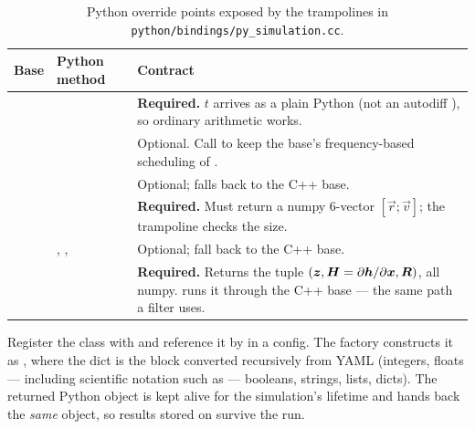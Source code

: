 \begin{table}[H]
  \centering
  \caption{Python override points exposed by the trampolines in
           \texttt{python/bindings/py\_simulation.cc}.}
  \label{tab:sim-trampolines}
  \begin{tabularx}{\textwidth}{@{}l l L@{}}
    \toprule
    Base & Python method & Contract \\
    \midrule
     &  & \textbf{Required.} $t$ arrives as
      a plain Python  (not an autodiff ), so ordinary
      arithmetic works. \\
    &  & Optional. Call
       to keep the base's frequency-based
      scheduling of . \\
    &  & Optional; falls back to the C++ base. \\
     &  & \textbf{Required.} Must return a
      numpy 6-vector $[\vec{r}; \vec{v}]$; the trampoline checks the size. \\
    & , ,  & Optional; fall back to the C++ base. \\
     &  & \textbf{Required.} Returns the
      tuple $(\bm{z}, \bm{H} = \partial \bm{h}/\partial \bm{x}, \bm{R})$, all
      numpy.  runs it through the C++ base --- the same path a
      filter uses. \\
    \bottomrule
  \end{tabularx}
\end{table}

Register the class with  and reference it
by  in a config. The factory constructs it as
, where the dict is the  block converted
recursively from YAML (integers, floats --- including scientific notation such as
 --- booleans, strings, lists, dicts). The returned Python object is
kept alive for the simulation's lifetime and
 hands back the \emph{same} object, so
results stored on  survive the run.

